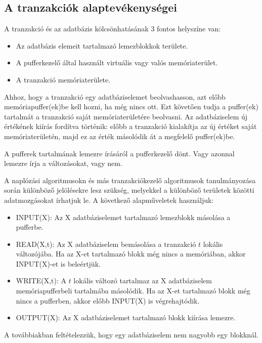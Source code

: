 \documentclass[margin=0px]{article}
\begin{document}
	\subsection{A tranzakciók alaptevékenységei}
	
	\noindent A tranzakció és az adatbázis kölcsönhatásának 3 fontos helyszíne van:
	\begin{itemize}
		\item	Az adatbázis elemeit tartalmazó lemezblokkok területe.
		\item	A pufferkezelő által használt virtuális vagy valós memóriaterület.
		\item	A tranzakció memóriaterülete.
	\end{itemize}
	
	Ahhoz, hogy a tranzakció egy adatbáziselemet beolvashasson, azt előbb memóriapuffer(ek)be kell hozni, ha még nincs ott.
	Ezt követően tudja a puffer(ek) tartalmát a tranzakció saját memóriaterületére beolvasni. Az adatbáziselem új
	értékének kiírás fordítva történik: előbb a tranzakció kialakítja az új értéket saját memóriaterületén, majd ez
	az érték másolódik át a megfelelő puffer(ek)be.
	
	A pufferek tartalmának lemezre írásáról a pufferkezelő dönt. Vagy azonnal lemezre írja a változásokat, vagy nem.
	
	A naplózási algoritmusokn és más tranzakciókezelő algoritmusok tanulmányozása során különböző jelölésekre lesz szükség,
	melyekkel a különböző területek közötti adatmozgásokat írhatjuk le. A következő alapműveletek használjuk:
	
	\begin{itemize}
		\item	INPUT(X): Az X adatbáziselemet tartalmazó lemezblokk másolása a pufferbe.
		\item	READ(X,t): Az X adatbáziselem bemásolása a tranzakció $t$ lokális változójába. Ha az X-et tartalmazó blokk még
		nincs a memóriában, akkor INPUT(X)-et is beleértjük.
		\item	WRITE(X,t): A $t$ lokális változó tartalmaz az X adatbáziselem memóriapufferbeli tartalmába másolódik. Ha az X-et
		tartalmazó blokk még nincs a pufferben, akkor előbb INPUT(X) is végrehajtódik.
		\item	OUTPUT(X): Az X adatbáziselemet tartalmazó blokk kiírása lemezre.
	\end{itemize}

	\noindent A továbbiakban feltételezzük, hogy egy adatbáziselem nem nagyobb egy blokknál.
	
\end{document}
